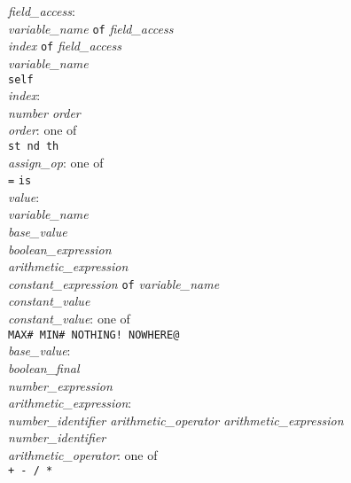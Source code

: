 \documentclass[a4paper]{article}
\begin{document}
\noindent\textit{field\_access}:\\
\indent\textit{variable\_name} \texttt{of} \textit{field\_access}\\
\indent\textit{index} \texttt{of} \textit{field\_access}\\
\indent\textit{variable\_name}\\
\indent\texttt{self}\\

\noindent\textit{index}:\\
\indent\textit{number order}\\

\noindent\textit{order}: one of\\
\indent \texttt{st nd th}\\

\noindent\textit{assign\_op}: one of\\
\indent \texttt{=} \texttt{is}\\

\noindent\textit{value}:\\
\indent\textit{variable\_name}\\
\indent\textit{base\_value}\\
\indent\textit{boolean\_expression}\\
\indent\textit{arithmetic\_expression}\\
\indent\textit{constant\_expression} \texttt{of} \textit{variable\_name}\\
\indent\textit{constant\_value}\\

\noindent\textit{constant\_value}: one of\\
\indent\texttt{MAX\# MIN\# NOTHING! NOWHERE@}\\

\noindent\textit{base\_value}:\\
\indent\textit{boolean\_final}\\
\indent\textit{number\_expression}\\

\noindent\textit{arithmetic\_expression}:\\
\indent\textit{number\_identifier arithmetic\_operator arithmetic\_expression}\\
\indent\textit{number\_identifier}\\

\noindent\textit{arithmetic\_operator}: one of\\
\indent \texttt{+ - / *}\\
\end{document}

